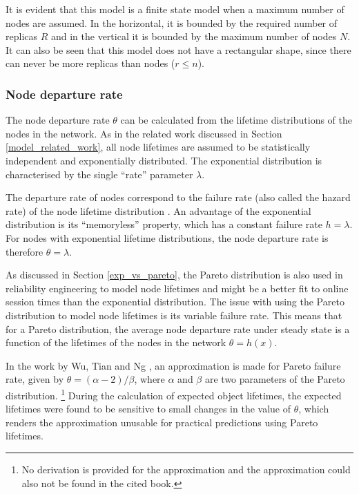 \documentclass[10pt,a4paper,conference]{IEEEtran}
\begin{document}
It is evident that this model is a finite state model when a maximum number of nodes are assumed. In the horizontal, it is bounded by the required number of replicas $R$ and in the vertical it is bounded by the maximum number of nodes $N$. It can also be seen that this model does not have a rectangular shape, since there can never be more replicas than nodes ($r\leq n$).

\subsubsection{Node departure rate}
\label{node_departure_rate}

The node departure rate $\theta$ can be calculated from the lifetime distributions of the nodes in the network. As in the related work discussed in Section \ref{model_related_work}, all node lifetimes are assumed to be statistically independent and exponentially distributed. The exponential distribution is characterised by the single ``rate'' parameter $\lambda$.

The departure rate of nodes correspond to the failure rate (also called the hazard rate) of the node lifetime distribution \cite{rausand2004systemreliability}. An advantage of the exponential distribution is its ``memoryless'' property, which has a constant failure rate $h = \lambda$. For nodes with exponential lifetime distributions, the node departure rate is therefore $\theta = \lambda$.

As discussed in Section \ref{exp_vs_pareto}, the Pareto distribution is also used in reliability engineering to model node lifetimes and might be a better fit to online session times than the exponential distribution. The issue with using the Pareto distribution to model node lifetimes is its variable failure rate. This means that for a Pareto distribution, the average node departure rate under steady state is a function of the lifetimes of the nodes in the network $\theta = h(x)$.

In the work by Wu, Tian and Ng \cite{replication_article}, an approximation is made for Pareto failure rate, given by $\theta=(\alpha-2)/\beta$, where $\alpha$ and $\beta$ are two parameters of the Pareto distribution. \footnote{No derivation is provided for the approximation and the approximation could also not be found in the cited book.} During the calculation of expected object lifetimes, the expected lifetimes were found to be sensitive to small changes in the value of $\theta$, which renders the approximation unusable for practical predictions using Pareto lifetimes.
\end{document}
